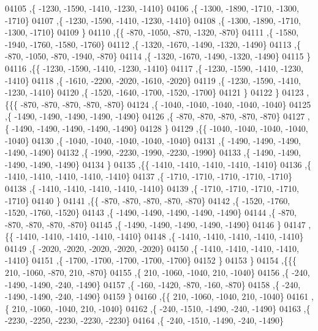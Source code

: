 \begin{DoxyCode}
04105     ,\{ -1230, -1590, -1410, -1230, -1410\}
04106     ,\{ -1300, -1890, -1710, -1300, -1710\}
04107     ,\{ -1230, -1590, -1410, -1230, -1410\}
04108     ,\{ -1300, -1890, -1710, -1300, -1710\}
04109     \}
04110    ,\{\{  -870, -1050,  -870, -1320,  -870\}
04111     ,\{ -1580, -1940, -1760, -1580, -1760\}
04112     ,\{ -1320, -1670, -1490, -1320, -1490\}
04113     ,\{  -870, -1050,  -870, -1940,  -870\}
04114     ,\{ -1320, -1670, -1490, -1320, -1490\}
04115     \}
04116    ,\{\{ -1230, -1590, -1410, -1230, -1410\}
04117     ,\{ -1230, -1590, -1410, -1230, -1410\}
04118     ,\{ -1610, -2200, -2020, -1610, -2020\}
04119     ,\{ -1230, -1590, -1410, -1230, -1410\}
04120     ,\{ -1520, -1640, -1700, -1520, -1700\}
04121     \}
04122    \}
04123   ,\{\{\{  -870,  -870,  -870,  -870,  -870\}
04124     ,\{ -1040, -1040, -1040, -1040, -1040\}
04125     ,\{ -1490, -1490, -1490, -1490, -1490\}
04126     ,\{  -870,  -870,  -870,  -870,  -870\}
04127     ,\{ -1490, -1490, -1490, -1490, -1490\}
04128     \}
04129    ,\{\{ -1040, -1040, -1040, -1040, -1040\}
04130     ,\{ -1040, -1040, -1040, -1040, -1040\}
04131     ,\{ -1490, -1490, -1490, -1490, -1490\}
04132     ,\{ -1990, -2230, -1990, -2230, -1990\}
04133     ,\{ -1490, -1490, -1490, -1490, -1490\}
04134     \}
04135    ,\{\{ -1410, -1410, -1410, -1410, -1410\}
04136     ,\{ -1410, -1410, -1410, -1410, -1410\}
04137     ,\{ -1710, -1710, -1710, -1710, -1710\}
04138     ,\{ -1410, -1410, -1410, -1410, -1410\}
04139     ,\{ -1710, -1710, -1710, -1710, -1710\}
04140     \}
04141    ,\{\{  -870,  -870,  -870,  -870,  -870\}
04142     ,\{ -1520, -1760, -1520, -1760, -1520\}
04143     ,\{ -1490, -1490, -1490, -1490, -1490\}
04144     ,\{  -870,  -870,  -870,  -870,  -870\}
04145     ,\{ -1490, -1490, -1490, -1490, -1490\}
04146     \}
04147    ,\{\{ -1410, -1410, -1410, -1410, -1410\}
04148     ,\{ -1410, -1410, -1410, -1410, -1410\}
04149     ,\{ -2020, -2020, -2020, -2020, -2020\}
04150     ,\{ -1410, -1410, -1410, -1410, -1410\}
04151     ,\{ -1700, -1700, -1700, -1700, -1700\}
04152     \}
04153    \}
04154   ,\{\{\{   210, -1060,  -870,   210,  -870\}
04155     ,\{   210, -1060, -1040,   210, -1040\}
04156     ,\{  -240, -1490, -1490,  -240, -1490\}
04157     ,\{  -160, -1420,  -870,  -160,  -870\}
04158     ,\{  -240, -1490, -1490,  -240, -1490\}
04159     \}
04160    ,\{\{   210, -1060, -1040,   210, -1040\}
04161     ,\{   210, -1060, -1040,   210, -1040\}
04162     ,\{  -240, -1510, -1490,  -240, -1490\}
04163     ,\{ -2230, -2250, -2230, -2230, -2230\}
04164     ,\{  -240, -1510, -1490,  -240, -1490\}

\end{DoxyCode}
